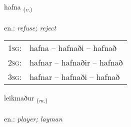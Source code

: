 \documentclass[frontgrid, backgrid]{flacards}\usepackage[]{graphicx}\usepackage[]{xcolor}
\begin{document}
\renewcommand{\flhead}{\vskip5pt \fboxsep=0pt {\small\bfseries\footnotesize Sagnorð | Verb}}
\renewcommand{\fcfoot}{\vskip5pt \fboxsep=0pt \hspace{2pt}{\small\bfseries\footnotesize 1K}}

\renewcommand{\blhead}{\vskip5pt {\small\bfseries\footnotesize Sagnorð | Verb }}
\renewcommand{\bcfoot}{\vskip5pt \hspace{2pt}{\small\bfseries\footnotesize 1K}}


{hafna \small{\textsubscript{(\textit{v.})}} \\[1ex] %
\textphonetic{[hapna]} \\
en.: \emph{refuse; reject} \\  [2ex]
\renewcommand*{\arraystretch}{0.8}
\begin{tabular}{p{1cm}l}
\textsc{1sg}: & hafna -- hafnaði -- hafnað \\ 
\textsc{2sg}: & hafnar -- hafnaðir -- hafnað \\ 
\textsc{3sg}: & hafnar -- hafnaði -- hafnað \\ 
\end{tabular}
}

\renewcommand{\flhead}{\vskip5pt \fboxsep=0pt {\small\bfseries\footnotesize Nafnorð | Noun}}
\renewcommand{\fcfoot}{\vskip5pt \fboxsep=0pt \hspace{2pt}{\small\bfseries\footnotesize 1K}}

\renewcommand{\blhead}{\vskip5pt {\small\bfseries\footnotesize Nafnorð | Noun }}
\renewcommand{\bcfoot}{\vskip5pt \hspace{2pt}{\small\bfseries\footnotesize 1K}}


{leikmaður \small{\textsubscript{(\textit{m.})}} \\[1ex] %
\textphonetic{[leikmaðʏr]} \\
en.: \emph{player; layman} \\  [2ex]
\renewcommand*{\arraystretch}{0.8}
}
\end{document}
